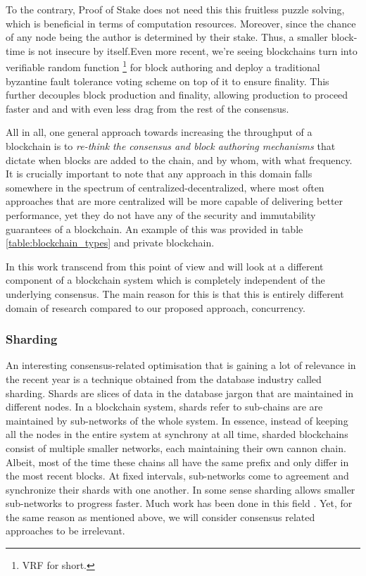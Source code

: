 To the contrary, Proof of Stake does not need this this fruitless puzzle solving, which is
beneficial in terms of computation resources. Moreover, since the chance of any node being the
author is determined by their stake. Thus, a smaller block-time is not insecure by itself.Even more
recent, we're seeing blockchains turn into verifiable random
function \cite{Dodis_Yampolskiy_2005_VRF}\footnote{VRF for short.} for block authoring and deploy a
traditional byzantine fault tolerance voting scheme on top of it to ensure finality. This further
decouples block production and finality, allowing production to proceed faster and and with even
less drag from the rest of the consensus.

All in all, one general approach towards increasing the throughput of a blockchain is to
\textit{re-think the consensus and block authoring mechanisms} that dictate when blocks are added to
the chain, and by whom, with what frequency. It is crucially important to note that any approach in
this domain falls somewhere in the spectrum of centralized-decentralized, where most often
approaches that are more centralized will be more capable of delivering better performance, yet they
do not have any of the security and immutability guarantees of a blockchain. An example of this was
provided in table \ref{table:blockchain_types} and private blockchain.

In this work transcend from this point of view and will look at a different component of a
blockchain system which is completely independent of the underlying consensus. The main reason for
this is that this is entirely different domain of research compared to our proposed approach,
concurrency.

\subsubsection{Sharding}

An interesting consensus-related optimisation that is gaining a lot of relevance in the recent year
is a technique obtained from the database industry called sharding. Shards are slices of data in the
database jargon that are maintained in different nodes. In a blockchain system, shards refer to
sub-chains are are maintained by sub-networks of the whole system. In essence, instead of keeping
all the nodes in the entire system at synchrony at all time, sharded blockchains consist of multiple
smaller networks, each maintaining their own cannon chain. Albeit, most of the time these chains all
have the same prefix and only differ in the most recent blocks. At fixed intervals, sub-networks
come to agreement and synchronize their shards with one another. In some sense sharding allows
smaller sub-networks to progress faster. Much work has been done in this field
\cite{Forestier_Vodenicarevic_Laversanne_Finot_2019_block_qlique,
Al_Bassam_Sonnino_Bano_Hrycyszyn_Danezis_2017_chainspace,
Shrey_Singh_Sathya_Yogesh_2019_diep_trans}. Yet, for the same reason as mentioned above, we will
consider consensus related approaches to be irrelevant.

